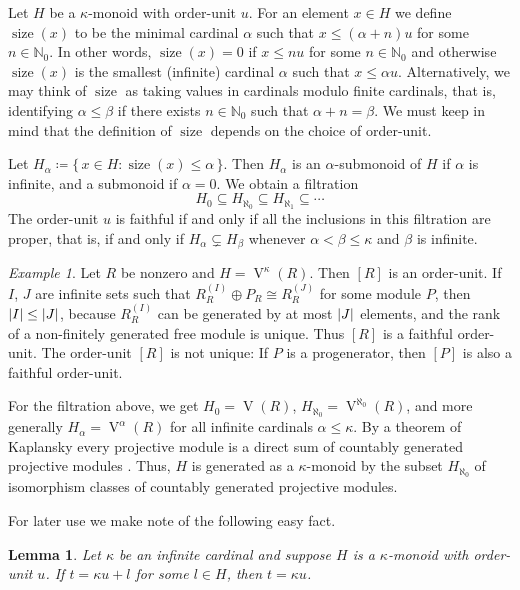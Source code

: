\documentclass[a4paper,11pt,oneside]{amsart}
\newtheorem{lemma}[teor]{Lemma}
\theoremstyle{remark}
\newtheorem{example}[teor]{Example}
\DeclareMathOperator{\size}{size}
\DeclarePairedDelimiter{\card}{\lvert}{\rvert}
\newcommand{\bN}{\mathbb N}
\DeclareMathOperator{\Vmon}{V}
\begin{document}
Let $H$ be a $\kappa$-monoid with order-unit $u$.
For an element $x \in H$ we define $\size(x)$ to be the minimal cardinal $\alpha$ such that $x \le (\alpha +n)u$ for some $n \in \bN_0$.
In other words, $\size(x) = 0$ if $x \le nu$ for some $n \in \bN_0$ and otherwise $\size(x)$ is the smallest (infinite) cardinal $\alpha$ such that $x \le \alpha u$.
Alternatively, we may think of $\size$ as taking values in cardinals modulo finite cardinals, that is, identifying $\alpha \le \beta$ if there exists $n \in \bN_0$ such that $\alpha+n=\beta$.
We must keep in mind that the definition of $\size$ depends on the choice of order-unit.

Let $H_\alpha \coloneqq \{\, x \in H : \size(x) \le \alpha \,\}$.
Then $H_\alpha$ is an $\alpha$-submonoid of $H$ if $\alpha$ is infinite, and a submonoid if $\alpha=0$.
We obtain a filtration
\[
  H_0 \subseteq H_{\aleph_0} \subseteq H_{\aleph_1} \subseteq \cdots
\]
The order-unit $u$ is faithful if and only if all the inclusions in this filtration are proper, that is, if and only if $H_\alpha \subsetneq H_\beta$ whenever $\alpha < \beta \le \kappa$ and $\beta$ is infinite.

\begin{example}
  Let $R$ be nonzero and $H = \Vmon^{\kappa}(R)$.
  Then $[R]$ is an order-unit.
  If $I$, $J$ are infinite sets such that $R_R^{(I)} \oplus P_R \cong R_R^{(J)}$ for some module $P$, then $\card{I} \le \card{J}$, because $R_R^{(I)}$ can be generated by at most $\card{J}$ elements, and the rank of a non-finitely generated free module is unique.
  Thus $[R]$ is a faithful order-unit.
  The order-unit $[R]$ is not unique: If $P$ is a progenerator, then $[P]$ is also a faithful order-unit.
  
  For the filtration above, we get $H_0 = \Vmon(R)$, $H_{\aleph_0} = \Vmon^{\aleph_0}(R)$, and more generally $H_\alpha = \Vmon^{\alpha}(R)$ for all infinite cardinals $\alpha \le \kappa$.
  By a theorem of Kaplansky every projective module is a direct sum of countably generated projective modules \cite{Kaplansky58}.
  Thus, $H$ is generated as a $\kappa$-monoid by the subset $H_{\aleph_0}$ of isomorphism classes of countably generated projective modules.
\end{example}

For later use we make note of the following easy fact.

\begin{lemma} \label{sumwithbig}
  Let $\kappa$ be an infinite cardinal and suppose $H$ is a $\kappa$-monoid with order-unit $u$.
  If $t = \kappa u +l $ for some $l \in H$, then $t = \kappa u$.
\end{lemma}
\end{document}
